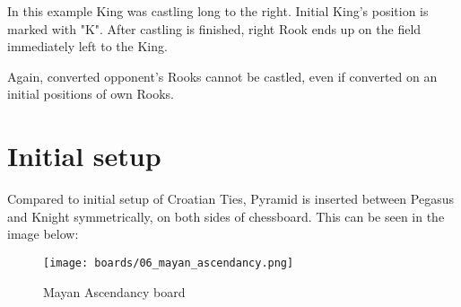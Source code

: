 In this example King was castling long to the right. Initial King's position is marked with "K".
After castling is finished, right Rook ends up on the field immediately left to the King.

Again, converted opponent's Rooks cannot be castled, even if converted on an initial
positions of own Rooks.

\clearpage %

\section*{Initial setup}
\label{sec:Mayan Ascendancy/Initial setup}

Compared to initial setup of Croatian Ties, Pyramid is inserted between Pegasus and Knight
symmetrically, on both sides of chessboard. This can be seen in the image below:

\noindent
\begin{figure}[h]
\texttt{[image: boards/06\_mayan\_ascendancy.png]}
\caption{Mayan Ascendancy board}
\label{fig:06_mayan_ascendancy}
\end{figure}

\clearpage %
